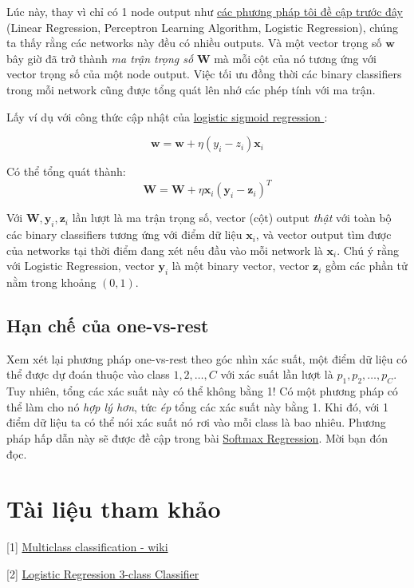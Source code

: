 Lúc này, thay vì chỉ có 1 node output như \href{http://machinelearningcoban.com/2017/01/27/logisticregression/#-thao-luan}{các phương pháp tôi đề cập trước đây} (Linear Regression, Perceptron Learning Algorithm, Logistic Regression), chúng ta thấy rằng các networks này đều có nhiều outputs. Và một vector trọng số $\mathbf{w}$ bây giờ đã trở thành \textit{ma trận trọng số} $\mathbf{W}$ mà mỗi cột của nó tương ứng với vector trọng số của một node output. Việc tối ưu đồng thời các binary classifiers trong mỗi network cũng được tổng quát lên nhớ các phép tính với ma trận.  
 
Lấy ví dụ với công thức cập nhật của \href{http://machinelearningcoban.com/2017/01/27/logisticregression/#cong-thuc-cap-nhat-cho-logistic-sigmoid-regression}{logistic sigmoid regression }: 
 
\begin{equation} 
\mathbf{w} = \mathbf{w} + \eta(y_i - z_i)\mathbf{x}_i 
\end{equation} 
 
Có thể tổng quát thành: 
\begin{equation} 
\mathbf{W} = \mathbf{W} + \eta\mathbf{x}_i(\mathbf{y}_i - \mathbf{z}_i)^T 
\end{equation} 
 
Với $\mathbf{W}, \mathbf{y}_i, \mathbf{z}_i$ lần lượt là ma trận trọng số, vector (cột) output \textit{thật} với toàn bộ các binary classifiers tương ứng với điểm dữ liệu $\mathbf{x}_i$, và vector output tìm được của networks tại thời điểm đang xét nếu đầu vào mỗi network là $\mathbf{x}_i$. Chú ý rằng với Logistic Regression, vector $\mathbf{y}_i$ là một binary vector, vector $\mathbf{z}_i$ gồm các phần tử nằm trong khoảng $(0, 1)$.  
 
 
\subsection{Hạn chế của one-vs-rest}
Xem xét lại phương pháp one-vs-rest theo góc nhìn xác suất, một điểm dữ liệu có thể được dự đoán thuộc vào class $1, 2, \dots, C$ với xác suất lần lượt là $p_1, p_2, \dots, p_C$. Tuy nhiên, tổng các xác suất này có thể không bằng 1! Có một phương pháp có thể làm cho nó \textit{hợp lý hơn}, tức \textit{ép} tổng các xác suất này bằng 1. Khi đó, với 1 điểm dữ liệu ta có thể nói xác suất nó rơi vào mỗi class là bao nhiêu. Phương pháp hấp dẫn này sẽ được đề cập trong bài \href{http://machinelearningcoban.com/2017/02/16/softmax/}{Softmax Regression}. Mời bạn đón đọc. 
 
 
\section{Tài liệu tham khảo}
 
 
[1] \href{https://en.wikipedia.org/wiki/Multiclass_classification}{Multiclass classification - wiki} 
 
[2] \href{http://scikit-learn.org/stable/auto_examples/linear_model/plot_iris_logistic.html}{Logistic Regression 3-class Classifier} 
